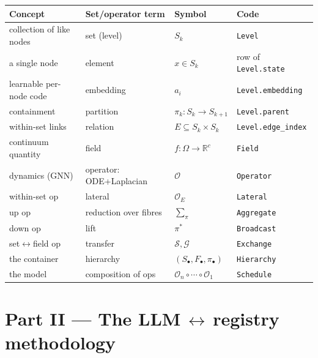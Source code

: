 \documentclass[11pt]{article}
\newcommand{\code}[1]{\texttt{#1}}
\begin{document}
\begin{center}
\renewcommand{\arraystretch}{1.2}
\begin{tabular}{@{}lll l@{}}
\toprule
\textbf{Concept} & \textbf{Set/operator term} & \textbf{Symbol} & \textbf{Code} \\
\midrule
collection of like nodes & set (level)          & $S_k$                       & \code{Level} \\
a single node            & element              & $x\in S_k$                  & row of \code{Level.state} \\
learnable per-node code  & embedding            & $a_i$                       & \code{Level.embedding} \\
containment              & partition            & $\pi_k\!:\!S_k\!\to\!S_{k+1}$& \code{Level.parent} \\
within-set links         & relation             & $E\subseteq S_k\times S_k$  & \code{Level.edge\_index} \\
continuum quantity       & field                & $f:\Omega\to\mathbb{R}^c$   & \code{Field} \\
dynamics (GNN)           & operator: ODE+Laplacian & $\mathcal{O}$            & \code{Operator} \\
within-set op            & lateral              & $\mathcal{O}_E$             & \code{Lateral} \\
up op                    & reduction over fibres& $\sum_\pi$                  & \code{Aggregate} \\
down op                  & lift                 & $\pi^{*}$                   & \code{Broadcast} \\
set$\leftrightarrow$field op & transfer          & $\mathcal{S},\mathcal{G}$   & \code{Exchange} \\
the container            & hierarchy            & $(S_\bullet,F_\bullet,\pi_\bullet)$ & \code{Hierarchy} \\
the model                & composition of ops   & $\mathcal{O}_n\!\circ\!\cdots\!\circ\!\mathcal{O}_1$ & \code{Schedule} \\
\bottomrule
\end{tabular}
\end{center}

\part*{Part II --- The LLM\,$\leftrightarrow$\,registry methodology}
\end{document}
